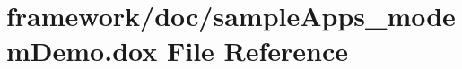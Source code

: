 \hypertarget{sample_apps__modem_demo_8dox}{}\section{framework/doc/sample\+Apps\+\_\+modem\+Demo.dox File Reference}
\label{sample_apps__modem_demo_8dox}
